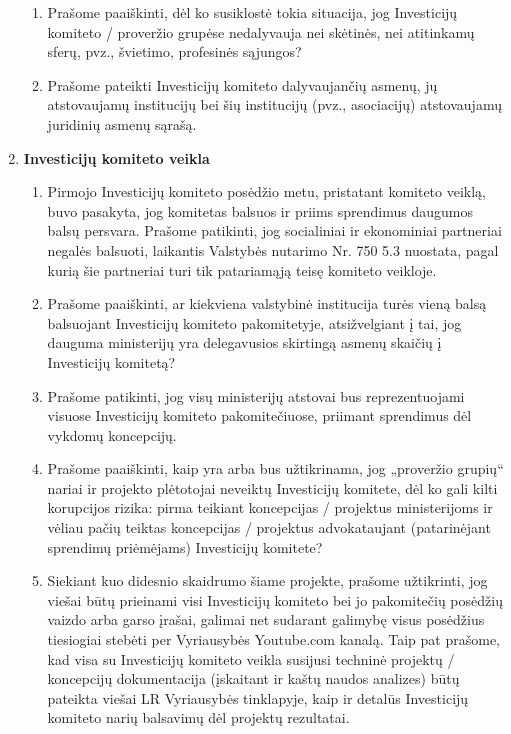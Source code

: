 \documentclass[12pt]{letter}
\begin{document}
\begin{enumerate}
\begin{enumerate}[resume]
\item Prašome paaiškinti, dėl ko susiklostė tokia situacija, jog Investicijų komiteto / proveržio grupėse nedalyvauja nei skėtinės, nei atitinkamų sferų, pvz., švietimo, profesinės sąjungos?

\item Prašome  pateikti Investicijų komiteto dalyvaujančių asmenų, jų atstovaujamų institucijų bei šių institucijų (pvz., asociacijų) atstovaujamų juridinių asmenų sąrašą.
\end{enumerate}



\item \textbf{Investicijų komiteto veikla}

\begin{enumerate}[resume]
\item Pirmojo Investicijų komiteto posėdžio metu, pristatant komiteto veiklą, buvo pasakyta, jog komitetas balsuos ir priims sprendimus daugumos balsų persvara. Prašome patikinti, jog socialiniai ir ekonominiai partneriai negalės balsuoti, laikantis Valstybės nutarimo Nr. 750 5.3 nuostata, pagal kurią šie partneriai turi tik patariamąją teisę komiteto veikloje.

\item Prašome paaiškinti, ar kiekviena valstybinė institucija turės vieną balsą balsuojant Investicijų komiteto pakomitetyje, atsižvelgiant į tai, jog dauguma ministerijų yra delegavusios skirtingą asmenų skaičių į Investicijų komitetą? 

\item Prašome patikinti, jog visų ministerijų atstovai bus reprezentuojami visuose Investicijų komiteto pakomitečiuose, priimant sprendimus dėl vykdomų koncepcijų. 

\item Prašome paaiškinti, kaip yra arba bus užtikrinama, jog „proveržio grupių“ nariai ir projekto plėtotojai neveiktų Investicijų komitete, dėl ko gali kilti korupcijos rizika: pirma teikiant koncepcijas / projektus ministerijoms ir vėliau pačių teiktas koncepcijas / projektus advokataujant (patarinėjant sprendimų priėmėjams) Investicijų komitete?

\item Siekiant kuo didesnio skaidrumo šiame projekte, prašome užtikrinti, jog viešai būtų prieinami visi Investicijų komiteto bei jo pakomitečių posėdžių vaizdo arba garso įrašai, galimai net sudarant galimybę visus posėdžius tiesiogiai stebėti per Vyriausybės Youtube.com kanalą. Taip pat prašome, kad visa su Investicijų komiteto veikla susijusi techninė projektų / koncepcijų dokumentacija (įskaitant ir kaštų naudos analizes) būtų pateikta viešai LR Vyriausybės tinklapyje, kaip ir detalūs Investicijų komiteto narių balsavimų dėl projektų rezultatai.
\end{enumerate}


\end{enumerate}
\end{document}
